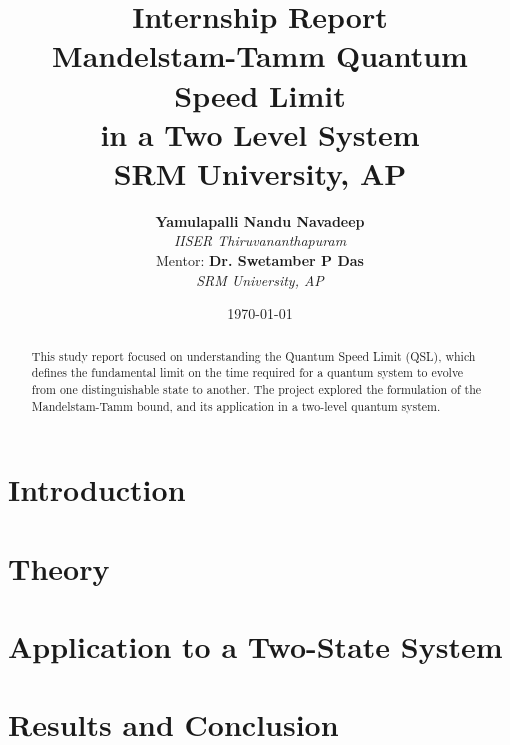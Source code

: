\documentclass[12pt,a4paper]{report}
\title{
    \vspace{1cm}
    \textbf{\Large Internship Report}\\[1cm]
    \textbf{\LARGE Mandelstam-Tamm Quantum Speed Limit\\[0.5cm] in a Two Level System}\\[1.5cm]
    \textbf{\Large SRM University, AP}\\[2cm]
}
\author{
    \textbf{Yamulapalli Nandu Navadeep} \\ 
    \textit{IISER Thiruvananthapuram} \\[1cm] 
    Mentor: \textbf{Dr. Swetamber P Das}\\
    \textit{SRM University, AP}\\
}
\date{\today}
\begin{document}
\maketitle

\begin{abstract}
This study report focused on understanding the Quantum Speed Limit (QSL), which defines the fundamental limit on the time required for a quantum system to evolve from one distinguishable state to another. The project explored the formulation of the Mandelstam-Tamm bound, and its application in a two-level quantum system. 
\end{abstract}

\tableofcontents
\pagebreak

\onehalfspacing

\chapter{Introduction}


\chapter{Theory}


\chapter{Application to a Two-State System}


\chapter{Results and Conclusion}




\end{document}
